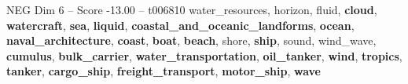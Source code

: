 \begin{textsample}{NEG Dim 6 – Score -13.00 – t006810}  \label{ex:f6_neg_004}
water\_resources, horizon, fluid, \textbf{cloud}, \textbf{watercraft}, \textbf{sea}, \textbf{liquid}, \textbf{coastal\_and\_oceanic\_landforms}, \textbf{ocean}, \textbf{naval\_architecture}, \textbf{coast}, \textbf{boat}, \textbf{beach}, shore, \textbf{ship}, sound, wind\_wave, \textbf{cumulus}, \textbf{bulk\_carrier}, \textbf{water\_transportation}, \textbf{oil\_tanker}, \textbf{wind}, \textbf{tropics}, \textbf{tanker}, \textbf{cargo\_ship}, \textbf{freight\_transport}, \textbf{motor\_ship}, \textbf{wave}

\end{textsample}
